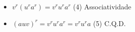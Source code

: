 \documentclass[a4paper,12pt]{article}
\begin{document}
\begin{enumerate}
\begin{itemize}
		 \item$v^r(u^ra^r)=v^ru^ra^r$
		 \space\space\space\space\space\space\space\space\space\space\space\space\space\space\space 
		 (4) Associatividade\\
		
		 
		 \item$(auv)^r=v^ru^ra^r=v^ru^ra$
		  \space\space\space\space\space\space
		 (5) C.Q.D.
		 
		 
		 

		 
		 
			
\end{itemize}	
		

	
	
\end{enumerate}



\medskip


	
\end{document}
